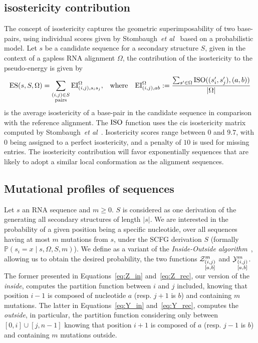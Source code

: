 \subsection{isostericity contribution}
The concept of isostericity captures the geometric superimposability of two base-pairs, using individual scores given by Stombaugh~\emph{et al}~\cite{Stombaugh2009} based on a probabilistic model. Let $s$ be a candidate sequence for a secondary structure $S$, given in the context of a gapless RNA alignment $\Omega$,  the contribution of the isostericity to the pseudo-energy is given by
\begin{align*}
  \text{ES}(s,S,\Omega) &= \sum_{\substack{(i,j)\in S\\ \text{pairs}}}\text{EI}^{\Omega}_{(i,j),s_i s_j}, & \text{where}&& 	\text{EI}^{\Omega}_{(i,j),ab}:=
	\frac{
		\sum_{s'\in\Omega}
			\text{\text{ISO}}((s_i',s_j'),(a,b))}
{		
		|\Omega|
	}
\end{align*}
is the average isostericity of a base-pair in the candidate sequence in comparison with the reference alignment.
The $\text{ISO}$ function uses the  cis isostericity matrix computed by Stombaugh~\emph{et al}~\cite{Stombaugh2009}. Isostericity scores range between $0$ and $9.7$, with $0$ being assigned to a perfect isostericity, and a penalty of $10$ is used for missing entries.
The isostericity contribution will favor exponentially sequences that are likely to adopt a similar local conformation as the alignment sequences.

\subsection{Mutational profiles of sequences}

Let $s$ an RNA 
sequence and $m\geq 0$. $S$ is considered as  one derivation of the  generating  
all  secondary structures of length  $|s|$. We are interested in  
the probability of a given position being a specific nucleotide,
over all sequences having at most $m$ mutations from $s$, under the SCFG derivation $S$ 
(formally 
$\mathbb{P}(s_i = x\mid s,\Omega, S,m)$). 
We define as a variant of the
 \emph{Inside-Outside algorithm}~\cite{Lari1990}, allowing us to obtain the
 desired probability,  the two  functions
$\Z{i,j}{m}{a,b}$ and $\Y{i,j}{m}{a,b}$. The former presented in 
Equations~\eqref{eq:Z_in} and~\eqref{eq:Z_rec}, our 
version of the \emph{inside}, computes the partition function between $i$ and $j$ included, 
knowing that position $i-1$ is composed of nucleotide $a$ (resp. $j+1$ is $b$) and containing 
$m$ mutations. The latter in Equations~\eqref{eq:Y_in} and~\eqref{eq:Y_rec},
 computes the \emph{outside}, in particular,  
the partition function considering only between $[0,i]\cup[j,n-1]$
knowing  that position $i+1$ is composed of $a$ (resp. $j-1$ is $b$) and containing 
 $m$ mutations outside.



